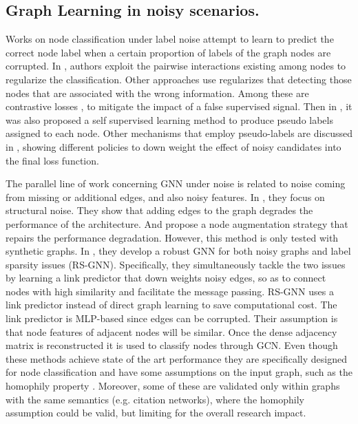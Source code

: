 \subsection{Graph Learning in noisy scenarios.} 
\label{sec:graphlearningundernoise}
Works on node classification under label noise attempt to learn to predict the correct node label when a certain proportion of labels of the graph nodes are corrupted. 
In \cite{pairwiseinteraction4}, authors exploit the pairwise interactions existing among nodes to regularize the classification.
Other approaches use regularizes that detecting those nodes that are associated with the wrong information. Among these are contrastive losses \cite{contrastivelearning5, cl9}, to mitigate the impact of a false supervised signal. Then in \cite{ssl8}, it was also proposed a self supervised learning method to produce pseudo labels assigned to each node. Other mechanisms that employ pseudo-labels are discussed in \cite{noisegovernance6}, showing different policies to down weight the effect of noisy candidates into the final loss function.

The parallel line of work concerning GNN under noise is related to noise coming from missing or additional edges, and also noisy features. In \cite{structuralnoise2}, they focus on structural noise. They show that adding edges to the graph degrades the performance of the architecture. And propose a node augmentation strategy that repairs the performance degradation. However, this method is only tested with synthetic graphs. In \cite{structuralnoise3}, they develop a robust GNN for both noisy graphs and label sparsity issues (RS-GNN). Specifically, they simultaneously tackle the two issues by learning a link predictor that down weights noisy edges, so as to connect nodes with high similarity and facilitate the message passing. RS-GNN uses a link predictor instead of direct graph learning to save computational cost.
The link predictor is MLP-based since edges can be corrupted. Their assumption is that node features of adjacent nodes will be similar. Once the dense adjacency matrix is reconstructed it is used to classify nodes through GCN. Even though these methods achieve state of the art performance they are specifically designed for node classification and have some assumptions on the input graph, such as the homophily property \cite{structuralnoise3, pairwiseinteraction4, contrastivelearning5, nrgnn11}. Moreover, some of these are validated only within graphs with the same semantics \cite{structuralnoise3, pairwiseinteraction4, ssl8, cl9, nrgnn11} (e.g. citation networks), where the homophily assumption could be valid, but limiting for the overall research impact.

